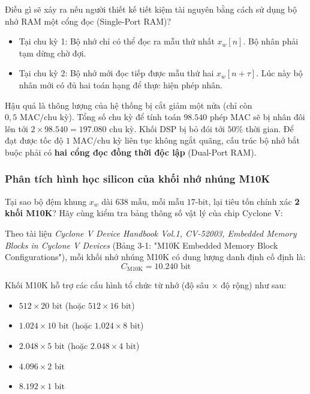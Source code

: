 Điều gì sẽ xảy ra nếu người thiết kế tiết kiệm tài nguyên bằng cách sử dụng bộ nhớ RAM một cổng đọc (Single-Port RAM)?
\begin{itemize}[leftmargin=1.5em, itemsep=2pt]
    \item Tại chu kỳ 1: Bộ nhớ chỉ có thể đọc ra mẫu thứ nhất $x_w[n]$. Bộ nhân phải tạm dừng chờ đợi.
    \item Tại chu kỳ 2: Bộ nhớ mới đọc tiếp được mẫu thứ hai $x_w[n+\tau]$. Lúc này bộ nhân mới có đủ hai toán hạng để thực hiện phép nhân.
\end{itemize}
Hậu quả là thông lượng của hệ thống bị cắt giảm một nửa (chỉ còn $0{,}5\text{ MAC/chu kỳ}$). Tổng số chu kỳ để tính toán $98.540\text{ phép MAC}$ sẽ bị nhân đôi lên tới $2 \times 98.540 = 197.080\text{ chu kỳ}$. Khối DSP bị bỏ đói tới $50\%$ thời gian. Để đạt được tốc độ $1\text{ MAC/chu kỳ}$ liên tục không ngắt quãng, cấu trúc bộ nhớ bắt buộc phải có \textbf{hai cổng đọc đồng thời độc lập} (Dual-Port RAM).

\subsubsection*{Phân tích hình học silicon của khối nhớ nhúng M10K}
Tại sao bộ đệm khung $x_w$ dài $638\text{ mẫu}$, mỗi mẫu $17\text{-bit}$, lại tiêu tốn chính xác \textbf{2 khối M10K}? Hãy cùng kiểm tra bảng thông số vật lý của chip Cyclone V:

Theo tài liệu \emph{Cyclone V Device Handbook Vol.1, CV-52003, Embedded Memory Blocks in Cyclone V Devices} (Bảng 3-1: "M10K Embedded Memory Block Configurations"), mỗi khối nhớ nhúng M10K có dung lượng danh định cố định là:
\begin{equation}
C_{\text{M10K}} = 10.240\text{ bit}
\end{equation}

Khối M10K hỗ trợ các cấu hình tổ chức từ nhớ (độ sâu $\times$ độ rộng) như sau:
\begin{itemize}[leftmargin=1.5em, itemsep=2pt]
    \item $512 \times 20\text{ bit}$ (hoặc $512 \times 16\text{ bit}$)
    \item $1.024 \times 10\text{ bit}$ (hoặc $1.024 \times 8\text{ bit}$)
    \item $2.048 \times 5\text{ bit}$ (hoặc $2.048 \times 4\text{ bit}$)
    \item $4.096 \times 2\text{ bit}$
    \item $8.192 \times 1\text{ bit}$
\end{itemize}

